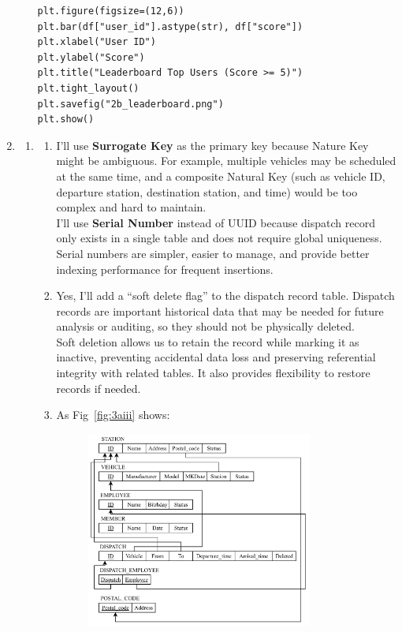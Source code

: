 \documentclass[12pt,a4paper]{article}
\begin{document}
\begin{enumerate}
\begin{enumerate}
\begin{verbatim}
plt.figure(figsize=(12,6))
plt.bar(df["user_id"].astype(str), df["score"])
plt.xlabel("User ID")
plt.ylabel("Score")
plt.title("Leaderboard Top Users (Score >= 5)")
plt.tight_layout()
plt.savefig("2b_leaderboard.png")
plt.show()            
        \end{verbatim}
    \end{enumerate}
    \item
    \begin{enumerate}
        \item 
        \begin{enumerate}
            \item I'll use \textbf{Surrogate Key} as the primary key because Nature Key might be ambiguous. For example, multiple vehicles may be scheduled at the same time, and a composite Natural Key (such as vehicle ID, departure station, destination station, and time) would be too complex and hard to maintain.\\
            I'll use \textbf{Serial Number} instead of UUID because dispatch record only exists in a single table and does not require global uniqueness. Serial numbers are simpler, easier to manage, and provide better indexing performance for frequent insertions.
            \item Yes, I’ll add a “soft delete flag” to the dispatch record table. Dispatch records are important historical data that may be needed for future analysis or auditing, so they should not be physically deleted.\\
            Soft deletion allows us to retain the record while marking it as inactive, preventing accidental data loss and preserving referential integrity with related tables. It also provides flexibility to restore records if needed.
            \item As Fig~\ref{fig:3aiii} shows:
            \begin{figure}[H]
                \centering
                \includegraphics[width=0.8\textwidth]{src/3aiii.png}

\end{figure}
\end{enumerate}
\end{enumerate}
\end{enumerate}
\end{document}
